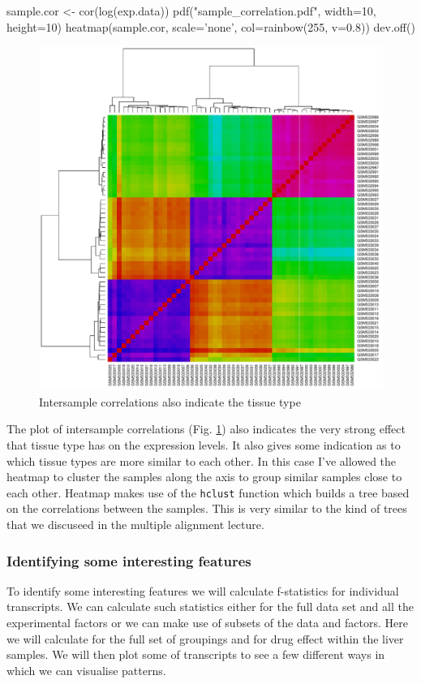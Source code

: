 \documentclass[11pt]{article}
\begin{document}
\begin{rcode}
  sample.cor <- cor(log(exp.data))
  pdf("sample_correlation.pdf", width=10, height=10)
  heatmap(sample.cor, scale='none', col=rainbow(255, v=0.8))
  dev.off()
\end{rcode}

\begin{figure}[ht]
  \includegraphics[width=\textwidth]{images/sample_correlation}
  \caption{Intersample correlations also indicate the tissue type}
  \label{corplot}
\end{figure}

The plot of intersample correlations (Fig. \ref{corplot}) also indicates
the very strong effect that tissue type has on the expression levels. It
also gives some indication as to which tissue types are more similar to each
other. In this case I've allowed the heatmap to cluster the samples along
the axis to group similar samples close to each other. Heatmap makes
use of the \texttt{hclust} function which builds a tree based on the 
correlations between the samples. This is very similar to the kind of trees
that we discuseed in the multiple alignment lecture.

\newpage


\subsubsection{Identifying some interesting features}
\label{sec-1-3-3}
To identify some interesting features we will calculate f-statistics for
individual transcripts. We can calculate such statistics either for
the full data set and all the experimental factors or we can make
use of subsets of the data and factors. Here we will calculate for
the full set of groupings and for drug effect within the liver samples.
We will then plot some of transcripts to see a few different ways in
which we can visualise patterns.
\end{document}
